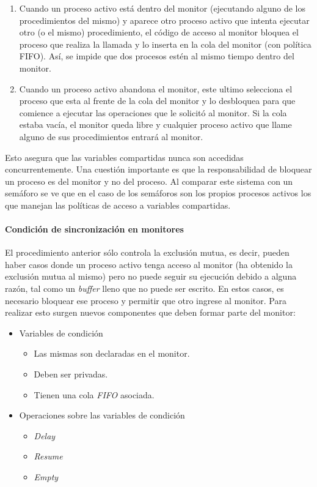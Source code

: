 \begin{enumerate}
    \item Cuando un proceso activo está dentro del monitor (ejecutando alguno de los procedimientos del mismo) y aparece otro proceso activo que intenta ejecutar otro (o el mismo) procedimiento, el código de acceso al monitor bloquea el proceso que realiza la llamada y lo inserta en la cola del monitor (con política FIFO). Así, se impide que dos procesos estén al mismo tiempo dentro del monitor.

    \item Cuando un proceso activo abandona el monitor, este ultimo selecciona el proceso que esta al frente de la cola del monitor y lo desbloquea para que comience a ejecutar las operaciones que le solicitó al monitor. Si la cola estaba vacía, el monitor queda libre y cualquier proceso activo que llame alguno de sus procedimientos entrará al monitor.
\end{enumerate}

Esto asegura que las variables compartidas nunca son accedidas concurrentemente. Una cuestión importante es que la responsabilidad de bloquear un proceso es del monitor y no del proceso.
Al comparar este sistema con un semáforo se ve que en el caso de los semáforos son los propios procesos activos los que manejan las políticas de acceso a variables compartidas.

\paragraph{Condición de sincronización en monitores}
\hfill
\par El procedimiento anterior sólo controla la exclusión mutua, es decir, pueden haber casos donde un proceso activo tenga acceso al monitor (ha obtenido la exclusión mutua al mismo) pero no puede seguir su ejecución debido a alguna razón, tal como un \textit{buffer} lleno que no puede ser escrito. En estos casos, es necesario bloquear ese proceso y permitir que otro ingrese al monitor. Para realizar esto surgen nuevos componentes que deben formar parte del monitor:

\begin{itemize}
    \item Variables de condición
    \begin{itemize}
        \item Las mismas son declaradas en el monitor. 
        \item Deben ser privadas. 
        \item Tienen una cola \textit{FIFO} asociada.
    \end{itemize}
    \item Operaciones sobre las variables de condición
    \begin{itemize}
        \item \textit{Delay}
        \item \textit{Resume}
        \item \textit{Empty}
    \end{itemize}
\end{itemize}

